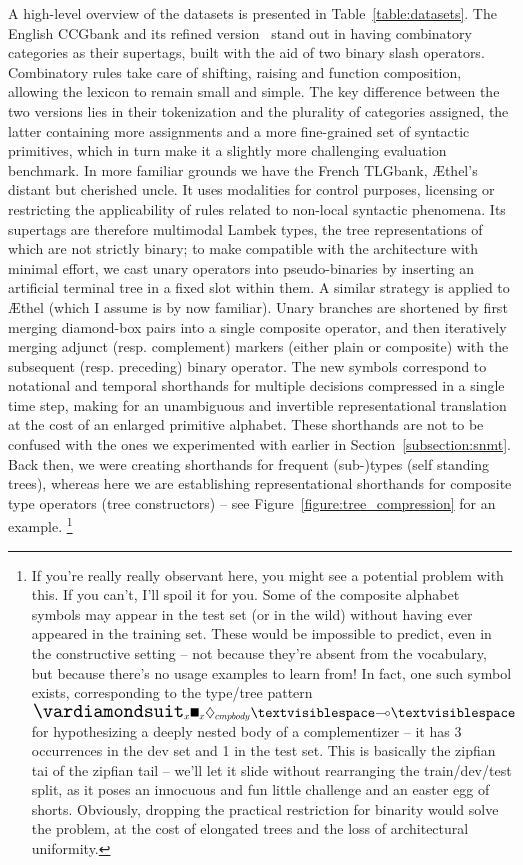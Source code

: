 A high-level overview of the datasets is presented in Table~\ref{table:datasets}.
The English CCGbank and its refined version~\cite[rebank]{honnibal2010rebanking} stand out in having combinatory categories as their supertags, built with the aid of two binary slash operators.
Combinatory rules take care of shifting, raising and function composition, allowing the lexicon to remain small and simple.
The key difference between the two versions lies in their tokenization and the plurality of categories assigned, the latter containing more assignments and a more fine-grained set of syntactic primitives, which in turn make it a slightly more challenging evaluation benchmark.
In more familiar grounds we have the French TLGbank, \AE thel's distant but cherished uncle. 
It uses modalities for control purposes, licensing or restricting the applicability of rules related to non-local syntactic phenomena.
Its supertags are therefore multimodal Lambek types, the tree representations of which are not strictly binary; to make compatible with the architecture with minimal effort, we cast unary operators into pseudo-binaries by inserting an artificial terminal tree in a fixed slot within them.
A similar strategy is applied to \AE thel (which I assume is by now familiar).
Unary branches are shortened by first merging diamond-box pairs into a single composite operator, and then iteratively merging adjunct (resp. complement) markers (either plain or composite) with the subsequent (resp. preceding) binary operator.
The new symbols correspond to notational and temporal shorthands for multiple decisions compressed in a single time step, making for an unambiguous and invertible representational translation at the cost of an enlarged primitive alphabet.
These shorthands are not to be confused with the ones we experimented with earlier in Section~\ref{subsection:snmt}.
Back then, we were creating shorthands for frequent (sub-)types (self standing trees), whereas here we are establishing representational shorthands for composite type operators (tree constructors) -- see Figure~\ref{figure:tree_compression} for an example.%
	\footnote{If you're really really observant here, you might see a potential problem with this. 
	If you can't, I'll spoil it for you.
	Some of the composite alphabet symbols may appear in the test set (or in the wild) without having ever appeared in the training set.
	These would be impossible to predict, even in the constructive setting -- not because they're absent from the vocabulary, but because there's no usage examples to learn from!
	In fact, one such symbol exists, corresponding to the type/tree pattern $\dxdia{x}\dxbox{x}\ddia{cmpbody} \textvisiblespace \li \textvisiblespace$ for hypothesizing a deeply nested body of a complementizer -- it has 3 occurrences in the dev set and 1 in the test set.
	This is basically the zipfian tai of the zipfian tail -- we'll let it slide without rearranging the train/dev/test split, as it poses an innocuous and fun little challenge and an easter egg of shorts.
	Obviously, dropping the practical restriction for binarity would solve the problem, at the cost of elongated trees and the loss of architectural uniformity.}

